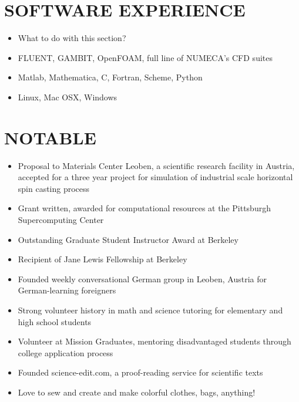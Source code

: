 \documentclass[11pt]{res} %
\begin{document}
\begin{resume}
\section{SOFTWARE EXPERIENCE}  
 \vspace{15pt}
\begin{itemize}  \itemsep -1pt 
	\item What to do with this section?  
	\item FLUENT, GAMBIT, OpenFOAM, full line of NUMECA's CFD suites
	\item Matlab, Mathematica,  C, Fortran, Scheme, Python  
	\item Linux, Mac OSX, Windows   
\end{itemize}  
 
\section{NOTABLE} 
 \vspace{15pt}
\begin{itemize}  \itemsep -1pt 
	\item Proposal to Materials Center Leoben, a scientific research facility in Austria, accepted for a three year project for simulation of industrial scale horizontal spin casting process   
	\item Grant written, awarded for computational resources at the Pittsburgh Supercomputing Center 
	\item Outstanding Graduate Student Instructor Award at Berkeley
	\item Recipient of Jane Lewis Fellowship at Berkeley
	\item Founded weekly conversational German group in Leoben, Austria for German-learning foreigners
	\item Strong volunteer history in math and science tutoring for elementary and high school students
	\item Volunteer at Mission Graduates, mentoring disadvantaged students through college application process          
	\item Founded science-edit.com, a proof-reading service for scientific texts                                       
	\item Love to sew and create and make colorful clothes, bags, anything!
\end{itemize} 


\end{resume}
\end{document}
